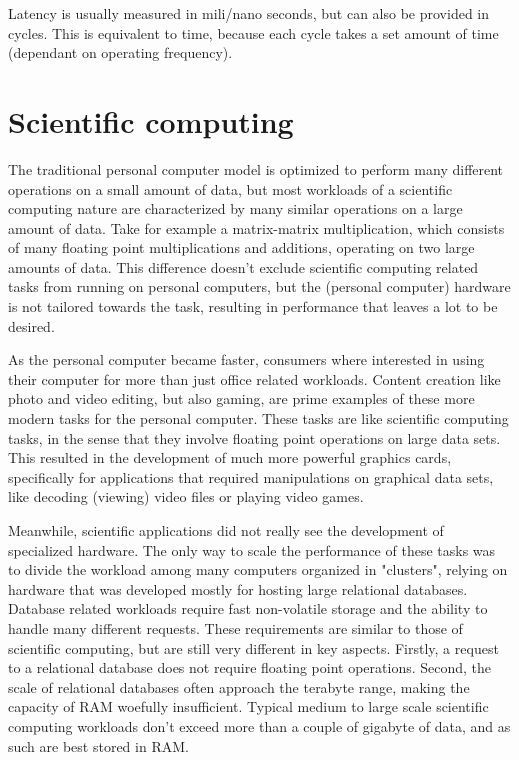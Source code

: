Latency is usually measured in mili/nano seconds, but can also be provided in cycles. This is equivalent to time, because each cycle takes a set amount of time (dependant on operating frequency).

\section{Scientific computing}

\hspace{4mm}The traditional personal computer model is optimized to perform many different operations on a small amount of data, but most workloads of a scientific computing nature are characterized by many similar operations on a large amount of data. Take for example a matrix-matrix multiplication, which consists of many floating point multiplications and additions, operating on two large amounts of data. This difference doesn't exclude scientific computing related tasks from running on personal computers, but the (personal computer) hardware is not tailored towards the task, resulting in performance that leaves a lot to be desired.\vspace{5mm}

As the personal computer became faster, consumers where interested in using their computer for more than just office related workloads. Content creation like photo and video editing, but also gaming, are prime examples of these more modern tasks for the personal computer. These tasks are like scientific computing tasks, in the sense that they involve floating point operations on large data sets. This resulted in the development of much more powerful graphics cards, specifically for applications that required manipulations on graphical data sets, like decoding (viewing) video files or playing video games.\vspace{5mm}

Meanwhile, scientific applications did not really see the development of specialized hardware. The only way to scale the performance of these tasks was to divide the workload among many computers organized in "clusters", relying on hardware that was developed mostly for hosting large relational databases. Database related workloads require fast non-volatile storage and the ability to handle many different requests. These requirements are similar to those of scientific computing, but are still very different in key aspects. Firstly, a request to a relational database does not require floating point operations. Second, the scale of relational databases often approach the terabyte range, making the capacity of RAM woefully insufficient. Typical medium to large scale scientific computing workloads don't exceed more than a couple of gigabyte of data, and as such are best stored in RAM.\vspace{5mm}

